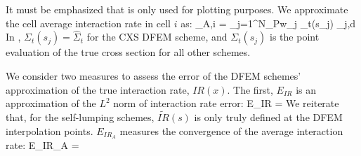 It must be emphasized that  is only used for plotting purposes.  
We approximate the cell average interaction rate in cell $i$ as:
\benum
\label{eq:chap3_ia_calc}
_{A,i} = \sum_{j=1}^{N_P}{w_j \Sigma_t(s_j) \psi_{j,d} }\pep
\eenum
In , $\Sigma_t(s_j) = \hat{\Sigma}_t$ for the CXS DFEM scheme, and $\Sigma_t(s_j)$ is the point evaluation of the true cross section for all other schemes.

We consider two measures to assess the error of the DFEM schemes' approximation of the true interaction rate, $IR(x)$.  The first, $E_{IR}$ is an approximation of the $L^2$ norm of interaction rate error:
\benum
E_{IR} =  \pep
\label{eq:chap3_EIR}
\eenum
We reiterate that, for the self-lumping schemes, $\widetilde{IR}(s)$ is only truly defined at the DFEM interpolation points.
$E_{IR_A}$ measures the convergence of the average interaction rate:
\benum
E_{IR_A} =  \pep
\eenum

